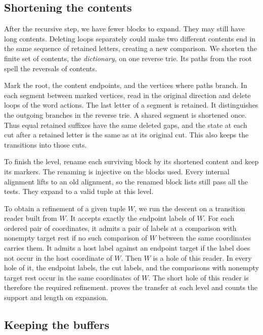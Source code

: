 \subsection{Shortening the contents}
\label{sec:contents}

After the recursive step, we have fewer blocks to expand. They may still
have long contents. Deleting loops separately could make two different
contents end in the same sequence of retained letters, creating a new
comparison. We shorten the finite set of contents, the \emph{dictionary},
on one reverse trie. Its paths from the root spell the reversals of
contents.

Mark the root, the content endpoints, and the vertices where paths
branch. In each segment between marked vertices, read in the original
direction and delete loops of the word actions. The last letter of a
segment is retained. It distinguishes the outgoing branches in the
reverse trie. A shared segment is shortened once. Thus equal retained
suffixes have the same deleted gaps, and the state at each cut after a
retained letter is the same as at its original cut. This also keeps
the transitions into those cuts.

To finish the level, rename each surviving block by its shortened
content and keep its markers. The renaming is injective on the blocks
used. Every internal alignment lifts to an old alignment, so the
renamed block lists still pass all the tests. They expand to a valid
tuple at this level.

To obtain a refinement of a given tuple $W$, we run the descent on a
transition reader built from $W$. It accepts exactly the endpoint labels
of $W$. For each ordered pair of coordinates, it admits a pair of labels at
a comparison with nonempty target rest if no such comparison of $W$
between the same coordinates carries them. It admits a host label against
an endpoint target if the label does not occur in the host coordinate of
$W$. Then $W$ is a hole of this reader. In every hole of it, the endpoint
labels, the cut labels, and the comparisons with nonempty target rest
occur in the same coordinates of $W$. The short hole of this reader is
therefore the required refinement.  proves the transfer at
each level and counts the support and length on expansion.

\subsection{Keeping the buffers}
\label{sec:buffers}

